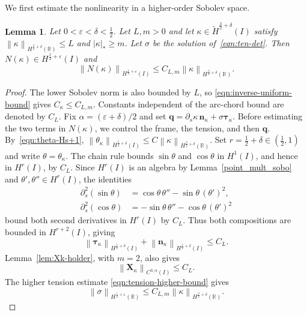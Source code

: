 \documentclass[11pt,reqno]{amsart}
\theoremstyle{plain}
\newtheorem{lemma}[theorem]{Lemma}
\theoremstyle{definition}
\numberwithin{equation}{section}
\newcommand{\p}{\partial}
\newcommand{\wt}[1]{\widetilde{#1}}
\newcommand{\bm}[1]{\boldsymbol{#1}}
\newcommand{\abs}[1]{\left\lvert #1 \right\rvert}
\newcommand{\norm}[1]{\left\lVert #1 \right\rVert}
\newcommand{\R}{\mathbb{R}}
\newcommand{\tk}{\bm\tau_\kappa}
\newcommand{\nk}{\bm n_\kappa}
\newcommand{\xk}{\bm X_\kappa}
\newcommand{\ci}[1]{C^{#1}(I)}
\newcommand{\hi}[1]{H^{#1}(I)}
\newcommand{\thi}[1]{\wt H^{#1}(I)}
\newcommand{\hr}[1]{H^{#1}(\R)}
\begin{document}
We first estimate the nonlinearity in a higher-order Sobolev space.
\begin{lemma}\label{lem:N-higher-est}
Let $0<\varepsilon<\delta< \frac{1}{2}$.
Let $L,m>0$ and let $\kappa\in\thi{\frac{3}{2}+\delta}$ satisfy
$\norm{\kappa}_{\hr{\frac32+\delta}}\le L$ and $\abs{\kappa}_*\ge m$.
Let $\sigma$ be the solution of~\eqref{eqn:ten-det}. Then
$N(\kappa)\in \hi{\frac{1}{2}+\varepsilon}$ and
\begin{equation}\label{eqn:N-higher-est}
    \norm{N(\kappa)}_{\hi{\frac{1}{2}+\varepsilon}}
    \le C_{L,m}
    \norm{\kappa}_{\hr{\frac{3}{2}+\delta}} .
\end{equation}
\end{lemma}
\begin{proof}
The lower Sobolev norm is also bounded by $L$, so
\eqref{eqn:inverse-uniform-bound} gives $C_\kappa\le C_{L,m}$.
Constants independent of the arc-chord bound are denoted by $C_L$.
Fix $\alpha=(\varepsilon+\delta)/2$ and set
$\bm q=\p_s\kappa\,\nk+\sigma\tk$. Before estimating the two terms in
$N(\kappa)$, we control the frame, the tension, and then $\bm q$.
By~\eqref{eqn:theta-Hs+1},
$\norm{\theta_\kappa}_{\hi{\frac{5}{2}+\delta}}
\le C\norm{\kappa}_{\hr{\frac{3}{2}+\delta}}$.
Set $r=\frac12+\delta\in(\frac12,1)$ and write $\theta=\theta_\kappa$.
The chain rule bounds $\sin\theta$ and $\cos\theta$ in $H^1(I)$,
and hence in $H^r(I)$, by $C_L$. Since $H^r(I)$ is an algebra by
Lemma~\ref{point_mult_sobo} and $\theta',\theta''\in H^r(I)$, the identities
\begin{align*}
    \p_s^2(\sin\theta)
    &=\cos\theta\,\theta''-\sin\theta\,(\theta')^2,\\
    \p_s^2(\cos\theta)
    &=-\sin\theta\,\theta''-\cos\theta\,(\theta')^2
\end{align*}
bound both second derivatives in $H^r(I)$ by $C_L$. Thus both
compositions are bounded in $H^{r+2}(I)$, giving
\begin{equation}\label{eqn:tau-n-high}
    \norm{\tk}_{\hi{\frac{5}{2}+\delta}}
    +\norm{\nk}_{\hi{\frac{5}{2}+\delta}}
    \le C_L .
\end{equation}
Lemma~\ref{lem:Xk-holder}, with $m=2$, also gives
\begin{equation}\label{eqn:X-high-C}
    \norm{\xk}_{\ci{3,\alpha}}
    \le C_L .
\end{equation}
The higher tension estimate
\eqref{eqn:tension-higher-bound} gives
\begin{equation}\label{eqn:sigma-high-for-N}
    \norm{\sigma}_{\hr{\frac{1}{2}+\varepsilon}}
    \le C_{L,m}
        \norm{\kappa}_{\hr{\frac{3}{2}+\delta}} .
\end{equation}


\end{proof}
\end{document}
